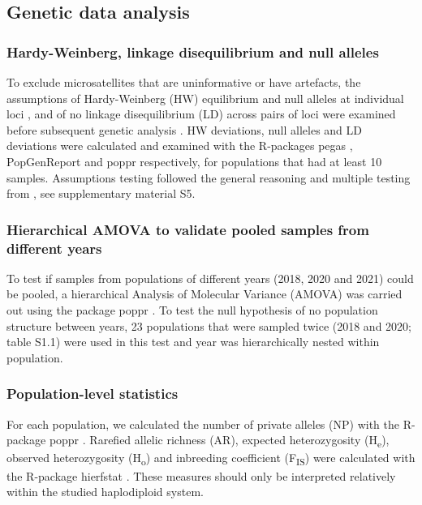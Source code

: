 \documentclass[10pt, twoside]{book} %
\begin{document}
	\subsection{Genetic data analysis}
	\subsubsection{Hardy-Weinberg, linkage disequilibrium and null alleles}
	To exclude microsatellites that are uninformative or have artefacts, the assumptions of Hardy-Weinberg (HW) equilibrium and null alleles at individual loci \citep[non-amplified alleles;][]{chapuis2007}, and of no linkage disequilibrium (LD) across pairs of loci were examined before subsequent genetic analysis \citep{waples2015}. HW deviations, null alleles and LD deviations were calculated and examined with the R-packages pegas \citep{paradis2010}, PopGenReport \citep{adamack2014} and poppr \citep{kamvar2014} respectively, for populations that had at least 10 samples. Assumptions testing followed the general reasoning and multiple testing from \citet{waples2015}, see supplementary material S5.\\
	
	\subsubsection{Hierarchical AMOVA to validate pooled samples from different years}\label{mmamova}
	To test if samples from populations of different years (2018, 2020 and 2021) could be pooled, a hierarchical Analysis of Molecular Variance (AMOVA) was carried out using the package poppr \citep{kamvar2014}. To test the null hypothesis of no population structure between years, 23 populations that were sampled twice (2018 and 2020; table S1.1) were used in this test and year was hierarchically nested within population.\\
	
	\subsubsection{Population-level statistics}
	For each population, we calculated the number of private alleles (NP) with the R-package poppr \citep{kamvar2014}. Rarefied allelic richness (AR), expected heterozygosity (H\textsubscript{e}), observed heterozygosity (H\textsubscript{o}) and inbreeding coefficient (F\textsubscript{IS}) were calculated with the R-package hierfstat \citep{goudet2020}. These measures should only be interpreted relatively within the studied haplodiploid system.\\
	
\end{document}
